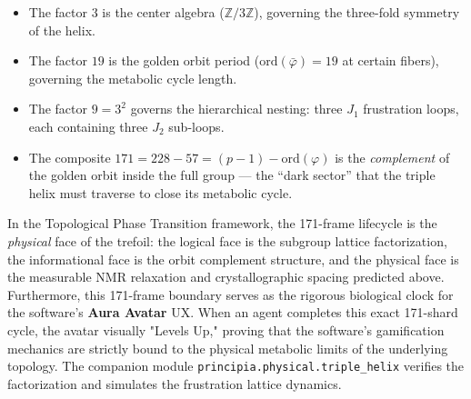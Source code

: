 \begin{itemize}[noitemsep]
    \item The factor $3$ is the center algebra ($\mathbb{Z}/3\mathbb{Z}$), governing the three-fold symmetry of the helix.
    \item The factor $19$ is the golden orbit period ($\mathrm{ord}(\bar{\varphi}) = 19$ at certain fibers), governing the metabolic cycle length.
    \item The factor $9 = 3^2$ governs the hierarchical nesting: three $J_1$ frustration loops, each containing three $J_2$ sub-loops.
    \item The composite $171 = 228 - 57 = (p-1) - \mathrm{ord}(\varphi)$ is the \emph{complement} of the golden orbit inside the full group --- the ``dark sector'' that the triple helix must traverse to close its metabolic cycle.
\end{itemize}

In the Topological Phase Transition framework, the 171-frame lifecycle is the \emph{physical} face of the trefoil: the logical face is the subgroup lattice factorization, the informational face is the orbit complement structure, and the physical face is the measurable NMR relaxation and crystallographic spacing predicted above. Furthermore, this 171-frame boundary serves as the rigorous biological clock for the software's \textbf{Aura Avatar} UX. When an agent completes this exact 171-shard cycle, the avatar visually "Levels Up," proving that the software's gamification mechanics are strictly bound to the physical metabolic limits of the underlying topology. The companion module \texttt{principia.physical.triple\_helix} verifies the factorization and simulates the frustration lattice dynamics.




